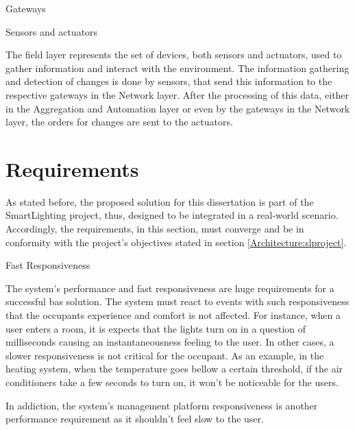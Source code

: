 \begin{Paragraph}{Gateways}
	
\end{Paragraph}

\begin{Paragraph}{Sensors and actuators}
	
	The field layer represents the set of devices, both sensors and actuators, used to gather information and interact with the environment. The information gathering and detection of changes is done by sensors, that send this information to the respective gateways in the Network layer. After the processing of this data, either in the Aggregation and Automation layer or even by the gateways in the Network layer, the orders for changes are sent to the actuators.
	
\end{Paragraph}

\section{Requirements}
\label{Architecture:Requirements}
As stated before, the proposed solution for this dissertation is part of the SmartLighting project, thus, designed to be integrated in a real-world scenario. Accordingly, the requirements, in this section, must converge and be in conformity with the project's objectives stated in section \ref{Architecture:slproject}. 

\begin{Paragraph}{Fast Responsiveness}

The system's performance and fast responsiveness are huge requirements for a successful \ac{bas} solution. The system must react to events with such responsiveness that the occupants experience and comfort is not affected. For instance, when a user enters a room, it is expects that the lights turn on in a question of milliseconds causing an instantaneousness feeling to the user. In other cases, a slower responsiveness is not critical for the occupant. As an example, in the heating system, when the temperature goes bellow a certain threshold, if the air conditioners take a few seconds to turn on, it won't be noticeable for the users.

In addiction, the system's management platform responsiveness is another performance requirement as it shouldn't feel slow to the user.

\end{Paragraph}

